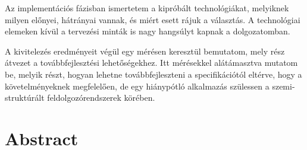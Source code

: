 Az implementációs fázisban ismertetem a kipróbált technológiákat, melyiknek milyen előnyei, hátrányai vannak, és miért esett rájuk a választás. A technológiai elemeken kívül a tervezési minták is nagy hangsúlyt kapnak a dolgozatomban.

A kivitelezés eredményeit végül egy mérésen keresztül bemutatom, mely rész átvezet a továbbfejlesztési lehetőségekhez. Itt mérésekkel alátámasztva mutatom be, melyik részt, hogyan lehetne továbbfejleszteni a specifikációtól eltérve, hogy a követelményeknek megfelelően, de egy hiánypótló alkalmazás szülessen a szemi-struktúrált feldolgozórendszerek körében.

\vfill

\chapter*{Abstract}


\vfill